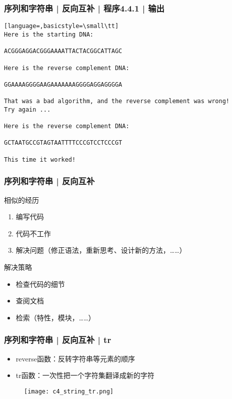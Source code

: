 \begin{frame}[fragile]
  \frametitle{序列和字符串 | 反向互补 | 程序4.4.1 | 输出}
\begin{lstlisting}[language=,basicstyle=\small\tt]
Here is the starting DNA:

ACGGGAGGACGGGAAAATTACTACGGCATTAGC

Here is the reverse complement DNA:

GGAAAAGGGGAAGAAAAAAAGGGGAGGAGGGGA

That was a bad algorithm, and the reverse complement was wrong!
Try again ...

Here is the reverse complement DNA:

GCTAATGCCGTAGTAATTTTCCCGTCCTCCCGT

This time it worked!
\end{lstlisting}
\end{frame}

\begin{frame}
  \frametitle{序列和字符串 | 反向互补}
   \begin{block}{相似的经历}
     \begin{enumerate}
       \item 编写代码
       \item 代码不工作
       \item 解决问题（修正语法，重新思考、设计新的方法，……）
     \end{enumerate}
   \end{block} 
   \pause
   \begin{block}{解决策略}
     \begin{itemize}
       \item 检查代码的细节
       \item 查阅文档
       \item 检索（特性，模块，……）
     \end{itemize}
   \end{block}
\end{frame}

\begin{frame}
  \frametitle{序列和字符串 | 反向互补 | \alert{tr}}
  \begin{itemize}
    \item reverse函数：反转字符串等元素的顺序
    \item tr函数：一次性把一个字符集翻译成新的字符
  \end{itemize}
  \begin{figure}
    \centering
    \texttt{[image: c4\_string\_tr.png]}
  \end{figure}
\end{frame}

